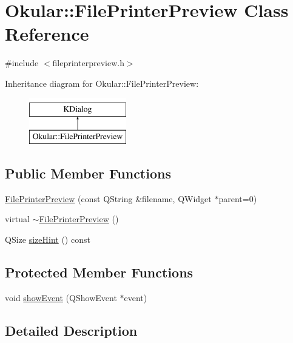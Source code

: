\hypertarget{classOkular_1_1FilePrinterPreview}{\section{Okular\+:\+:File\+Printer\+Preview Class Reference}
\label{classOkular_1_1FilePrinterPreview}
}


{\ttfamily \#include $<$fileprinterpreview.\+h$>$}

Inheritance diagram for Okular\+:\+:File\+Printer\+Preview\+:\begin{figure}[H]
\begin{center}
\leavevmode
\includegraphics[height=2.000000cm]{classOkular_1_1FilePrinterPreview}
\end{center}
\end{figure}
\subsection*{Public Member Functions}
\begin{DoxyCompactItemize}
\item 
\hyperlink{classOkular_1_1FilePrinterPreview_a9293bd820e3fb2210410e481935421e6}{File\+Printer\+Preview} (const Q\+String \&filename, Q\+Widget $\ast$parent=0)
\item 
virtual \hyperlink{classOkular_1_1FilePrinterPreview_a660fd133284f02dd0e367fea78331fe3}{$\sim$\+File\+Printer\+Preview} ()
\item 
Q\+Size \hyperlink{classOkular_1_1FilePrinterPreview_ae0ec45b69180e534d9b2688700ef6ec5}{size\+Hint} () const 
\end{DoxyCompactItemize}
\subsection*{Protected Member Functions}
\begin{DoxyCompactItemize}
\item 
void \hyperlink{classOkular_1_1FilePrinterPreview_affa688a826ecafc4b305da26b3d0aa4b}{show\+Event} (Q\+Show\+Event $\ast$event)
\end{DoxyCompactItemize}


\subsection{Detailed Description}


